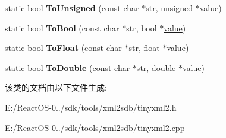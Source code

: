 \begin{DoxyCompactItemize}
\item 
\mbox{\label{classtinyxml2_1_1_x_m_l_util_a210c8637d5eb4ce3d4625294af0efc2f}} 
static bool {\bfseries To\+Unsigned} (const char $\ast$str, unsigned $\ast$\hyperlink{unionvalue}{value})
\item 
\mbox{\label{classtinyxml2_1_1_x_m_l_util_ae5b03e0a1ca5d42052a7ac540f7aa12a}} 
static bool {\bfseries To\+Bool} (const char $\ast$str, bool $\ast$\hyperlink{unionvalue}{value})
\item 
\mbox{\label{classtinyxml2_1_1_x_m_l_util_a399e71edb5f29d61ea81d91ee0332bb9}} 
static bool {\bfseries To\+Float} (const char $\ast$str, float $\ast$\hyperlink{unionvalue}{value})
\item 
\mbox{\label{classtinyxml2_1_1_x_m_l_util_ad8f75ac140fb19c1c6e164a957c4cd53}} 
static bool {\bfseries To\+Double} (const char $\ast$str, double $\ast$\hyperlink{unionvalue}{value})
\end{DoxyCompactItemize}


该类的文档由以下文件生成\+:\begin{DoxyCompactItemize}
\item 
E\+:/\+React\+O\+S-\/0../sdk/tools/xml2sdb/tinyxml2.\+h\item 
E\+:/\+React\+O\+S-\/0../sdk/tools/xml2sdb/tinyxml2.\+cpp\end{DoxyCompactItemize}
